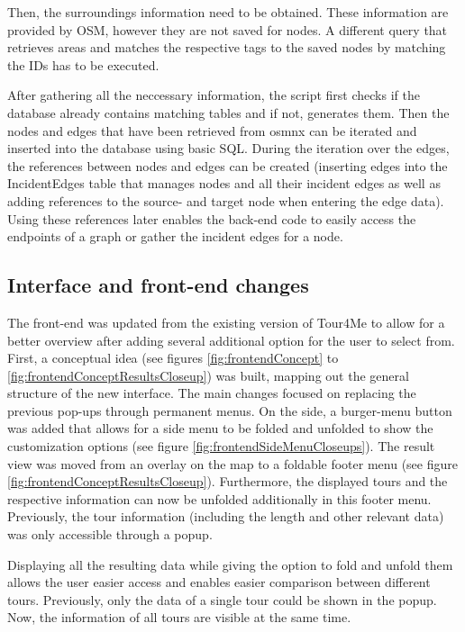 Then, the surroundings information need to be obtained. 
These information are provided by OSM, however they are not saved for nodes.
A different query that retrieves areas and matches the respective tags to the saved nodes by matching the IDs has to be executed.

After gathering all the neccessary information, the script first checks if the database already contains matching tables and if not, generates them.
Then the nodes and edges that have been retrieved from osmnx can be iterated and inserted into the database using basic SQL.
During the iteration over the edges, the references between nodes and edges can be created (inserting edges into the IncidentEdges table that manages nodes and all their incident edges as well as adding references to the source- and target node when entering the edge data).
Using these references later enables the back-end code to easily access the endpoints of a graph or gather the incident edges for a node. 



\subsection{Interface and front-end changes}
\label{subsec:interfaceAndFrontendChanges}

The front-end was updated from the existing version of Tour4Me to allow for a better overview after adding several additional option for the user to select from. 
First, a conceptual idea (see figures \ref{fig:frontendConcept} to \ref{fig:frontendConceptResultsCloseup}) was built, mapping out the general structure of the new interface. 
The main changes focused on replacing the previous pop-ups through permanent menus.
On the side, a burger-menu button was added that allows for a side menu to be folded and unfolded to show the customization options (see figure \ref{fig:frontendSideMenuCloseups}). 
The result view was moved from an overlay on the map to a foldable footer menu (see figure \ref{fig:frontendConceptResultsCloseup}). 
Furthermore, the displayed tours and the respective information can now be unfolded additionally in this footer menu.
Previously, the tour information (including the length and other relevant data) was only accessible through a popup. 

Displaying all the resulting data while giving the option to fold and unfold them allows the user easier access and enables easier comparison between different tours.
Previously, only the data of a single tour could be shown in the popup. 
Now, the information of all tours are visible at the same time. 

